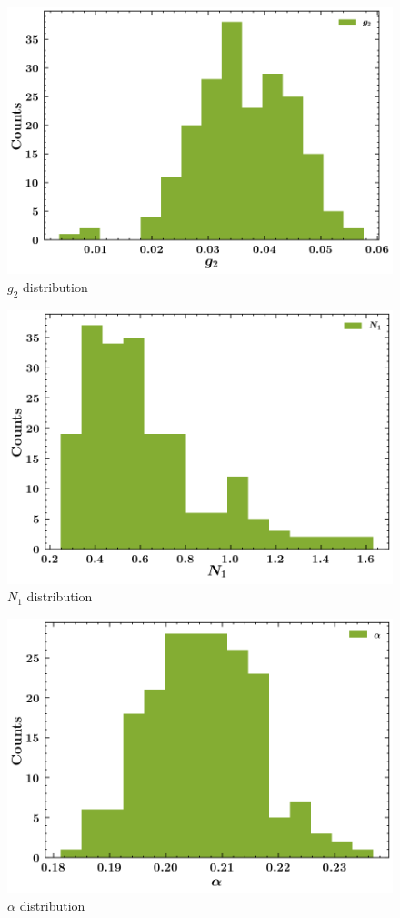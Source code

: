 \documentclass[
]{article}
\begin{document}
\begin{figure}
\centering
\includegraphics{pngplots/param0.png}
\caption{\(g_2\) distribution}
\end{figure}

\begin{figure}
\centering
\includegraphics{pngplots/param1.png}
\caption{\(N_1\) distribution}
\end{figure}

\begin{figure}
\centering
\includegraphics{pngplots/param2.png}
\caption{\(\alpha\) distribution}
\end{figure}
\end{document}

